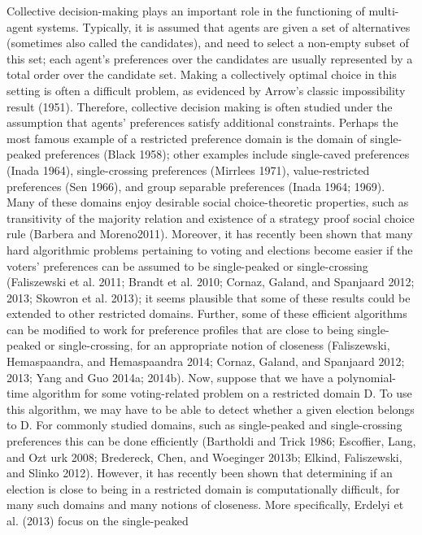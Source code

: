 \documentclass[11pt]{article}
\begin{document}
{\raggedright
Collective decision-making plays an important role in the functioning of
multi-agent systems. Typically, it is assumed that agents are given a set of
alternatives (sometimes also called the candidates), and need to select a
non-empty subset of this set; each agent's preferences over the candidates are
usually represented by a total order over the candidate set. Making a
collectively optimal choice in this setting is often a difficult problem, as
evidenced by Arrow's classic impossibility result (1951). Therefore, collective
decision making is often studied under the assumption that agents' preferences
satisfy additional constraints. Perhaps the most famous example of a restricted
preference domain is the domain of single-peaked preferences (Black 1958); other
examples include single-caved preferences (Inada 1964), single-crossing
preferences (Mirrlees 1971), value-restricted preferences (Sen 1966), and group
separable preferences (Inada 1964; 1969). Many of these domains enjoy desirable
social choice-theoretic properties, such as transitivity of the majority relation
and existence of a strategy proof social choice rule (Barbera and Moreno2011).
Moreover, it has recently been shown that many hard algorithmic problems
pertaining to voting and elections become easier if the voters' preferences can
be assumed to be single-peaked or single-crossing (Faliszewski et al. 2011;
Brandt et al. 2010; Cornaz, Galand, and Spanjaard 2012; 2013; Skowron et al.
2013); it seems plausible that some of these results could be extended to other
restricted domains. Further, some of these efficient algorithms can be modified
to work for preference profiles that are close to being single-peaked or
single-crossing, for an appropriate notion of closeness (Faliszewski,
Hemaspaandra, and Hemaspaandra 2014; Cornaz, Galand, and Spanjaard 2012; 2013;
Yang and Guo 2014a; 2014b). Now, suppose that we have a polynomial-time algorithm
for some voting-related problem on a restricted domain D. To use this algorithm,
we may have to be able to detect whether a given election belongs to D. For
commonly studied domains, such as single-peaked and single-crossing preferences
this can be done efficiently (Bartholdi and Trick 1986; Escoffier, Lang, and Ozt
\textasciidieresis{} urk 2008; Bredereck, Chen, \textasciidieresis{} and
Woeginger 2013b; Elkind, Faliszewski, and Slinko 2012). However, it has recently
been shown that determining if an election is close to being in a restricted
domain is computationally difficult, for many such domains and many notions of
closeness. More specifically, Erdelyi et al. (2013) focus on the single-peaked
}
\end{document}
